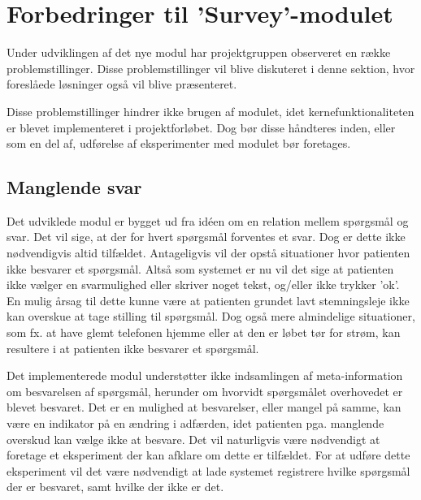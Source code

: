 
\section{Forbedringer til 'Survey'-modulet}
Under udviklingen af det nye modul har projektgruppen observeret en række problemstillinger.
Disse problemstillinger vil blive diskuteret i denne sektion, hvor foreslåede løsninger også vil blive præsenteret.

Disse problemstillinger hindrer ikke brugen af modulet, idet kernefunktionaliteten er blevet implementeret i projektforløbet.
Dog bør disse håndteres inden, eller som en del af, udførelse af eksperimenter med modulet bør foretages.

\subsection{Manglende svar}
Det udviklede modul er bygget ud fra idéen om en relation mellem spørgsmål og svar.
Det vil sige, at der for hvert spørgsmål forventes et svar.
Dog er dette ikke nødvendigvis altid tilfældet.
Antageligvis vil der opstå situationer hvor patienten ikke besvarer et spørgsmål.
Altså som systemet er nu vil det sige at patienten ikke vælger en svarmulighed eller skriver noget tekst, og/eller ikke trykker 'ok'.
En mulig årsag til dette kunne være at patienten grundet lavt stemningsleje ikke kan overskue at tage stilling til spørgsmål.
Dog også mere almindelige situationer, som fx. at have glemt telefonen hjemme eller at den er løbet tør for strøm, kan resultere i at patienten ikke besvarer et spørgsmål.

Det implementerede modul understøtter ikke indsamlingen af meta-information om besvarelsen af spørgsmål, herunder om hvorvidt spørgsmålet overhovedet er blevet besvaret.
Det er en mulighed at besvarelser, eller mangel på samme, kan være en indikator på en ændring i adfærden, idet patienten pga. manglende overskud kan vælge ikke at besvare.
Det vil naturligvis være nødvendigt at foretage et eksperiment der kan afklare om dette er tilfældet.
For at udføre dette eksperiment vil det være nødvendigt at lade systemet registrere hvilke spørgsmål der er besvaret, samt hvilke der ikke er det.

